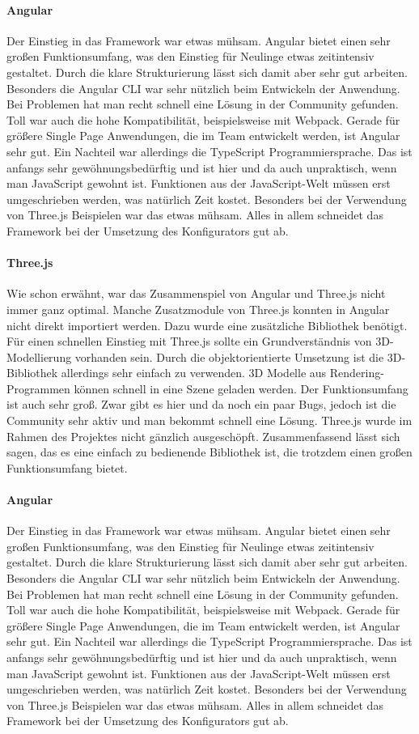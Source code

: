 \paragraph{Angular}
Der Einstieg in das Framework war etwas mühsam. Angular bietet einen sehr großen Funktionsumfang, was den Einstieg für Neulinge etwas zeitintensiv gestaltet. Durch die klare Strukturierung lässt sich damit aber sehr gut arbeiten. Besonders die Angular CLI war sehr nützlich beim Entwickeln der Anwendung. Bei Problemen hat man recht schnell eine Lösung in der Community gefunden. Toll war auch die hohe Kompatibilität, beispielsweise mit Webpack. Gerade für größere Single Page Anwendungen, die im Team entwickelt werden, ist Angular sehr gut. Ein Nachteil war allerdings die TypeScript Programmiersprache. Das ist anfangs sehr gewöhnungsbedürftig und ist hier und da auch unpraktisch, wenn man JavaScript gewohnt ist. Funktionen aus der JavaScript-Welt müssen erst umgeschrieben werden, was natürlich Zeit kostet. Besonders bei der Verwendung von Three.js Beispielen war das etwas mühsam. Alles in allem schneidet das Framework bei der Umsetzung des Konfigurators gut ab.
\paragraph{Three.js}
Wie schon erwähnt, war das Zusammenspiel von Angular und Three.js nicht immer ganz optimal. Manche Zusatzmodule von Three.js konnten in Angular nicht direkt importiert werden. Dazu wurde eine zusätzliche Bibliothek benötigt. Für einen schnellen Einstieg mit Three.js sollte ein Grundverständnis von 3D-Modellierung vorhanden sein. Durch die objektorientierte Umsetzung ist die 3D-Bibliothek allerdings sehr einfach zu verwenden. 3D Modelle aus Rendering-Programmen können schnell in eine Szene geladen werden. Der Funktionsumfang ist auch sehr groß. Zwar gibt es hier und da noch ein paar Bugs, jedoch ist die Community sehr aktiv und man bekommt schnell eine Lösung. Three.js wurde im Rahmen des Projektes nicht gänzlich ausgeschöpft. Zusammenfassend lässt sich sagen, das es eine einfach zu bedienende Bibliothek ist, die trotzdem einen großen Funktionsumfang bietet.
\paragraph{Angular}
Der Einstieg in das Framework war etwas mühsam. Angular bietet einen sehr großen Funktionsumfang, was den Einstieg für Neulinge etwas zeitintensiv gestaltet. Durch die klare Strukturierung lässt sich damit aber sehr gut arbeiten. Besonders die Angular CLI war sehr nützlich beim Entwickeln der Anwendung. Bei Problemen hat man recht schnell eine Lösung in der Community gefunden. Toll war auch die hohe Kompatibilität, beispielsweise mit Webpack. Gerade für größere Single Page Anwendungen, die im Team entwickelt werden, ist Angular sehr gut. Ein Nachteil war allerdings die TypeScript Programmiersprache. Das ist anfangs sehr gewöhnungsbedürftig und ist hier und da auch unpraktisch, wenn man JavaScript gewohnt ist. Funktionen aus der JavaScript-Welt müssen erst umgeschrieben werden, was natürlich Zeit kostet. Besonders bei der Verwendung von Three.js Beispielen war das etwas mühsam. Alles in allem schneidet das Framework bei der Umsetzung des Konfigurators gut ab.
